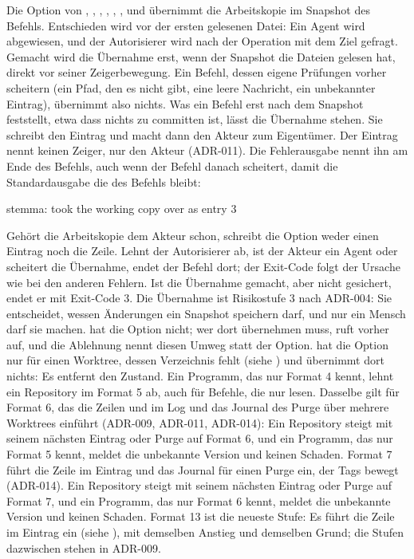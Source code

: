 Die Option  von , , , ,
, ,  und  übernimmt die Arbeitskopie
im Snapshot des Befehls.
Entschieden wird vor der ersten gelesenen Datei: Ein Agent wird abgewiesen, und der Autorisierer
wird nach der Operation  mit dem Ziel  gefragt.
Gemacht wird die Übernahme erst, wenn der Snapshot die Dateien gelesen hat, direkt vor seiner
Zeigerbewegung. Ein Befehl, dessen eigene Prüfungen vorher scheitern (ein Pfad, den es nicht
gibt, eine leere Nachricht, ein unbekannter Eintrag), übernimmt also nichts.
Was ein Befehl erst nach dem Snapshot feststellt, etwa dass nichts zu committen ist,
lässt die Übernahme stehen.
Sie schreibt den Eintrag  und macht dann den Akteur zum Eigentümer.
Der Eintrag nennt keinen Zeiger, nur den Akteur (ADR-011).
Die Fehlerausgabe nennt ihn am Ende des Befehls, auch wenn der Befehl danach scheitert,
damit die Standardausgabe die des Befehls bleibt:

\starttyping
stemma: took the working copy over as entry 3
\stoptyping

Gehört die Arbeitskopie dem Akteur schon, schreibt die Option weder einen Eintrag noch die Zeile.
Lehnt der Autorisierer ab, ist der Akteur ein Agent oder scheitert die Übernahme,
endet der Befehl dort; der Exit-Code folgt der Ursache wie bei den anderen Fehlern.
Ist die Übernahme gemacht, aber nicht gesichert, endet er mit Exit-Code 3.
Die Übernahme ist Risikostufe 3 nach ADR-004: Sie entscheidet, wessen Änderungen ein Snapshot
speichern darf, und nur ein Mensch darf sie machen.  hat
die Option nicht; wer dort übernehmen muss, ruft vorher  auf,
und die Ablehnung nennt diesen Umweg statt der Option.
 hat die Option nur für einen Worktree, dessen Verzeichnis fehlt
(siehe ) und übernimmt dort nichts: Es entfernt den Zustand.
Ein Programm, das nur Format 4 kennt, lehnt ein Repository im Format 5 ab, auch für Befehle,
die nur lesen. Dasselbe gilt für Format 6, das die Zeilen  und 
im Log und das Journal des Purge über mehrere Worktrees einführt (ADR-009, ADR-011, ADR-014):
Ein Repository steigt mit seinem nächsten Eintrag oder Purge auf Format 6, und ein Programm,
das nur Format 5 kennt, meldet die unbekannte Version und keinen Schaden.
Format 7 führt die Zeile  im Eintrag  und das
Journal  für einen Purge ein, der Tags bewegt (ADR-014). Ein Repository
steigt mit seinem nächsten Eintrag oder Purge auf Format 7, und ein Programm, das nur
Format 6 kennt, meldet die unbekannte Version und keinen Schaden.
Format 13 ist die neueste Stufe: Es führt die Zeile  im Eintrag
 ein (siehe ), mit demselben Anstieg und demselben
Grund; die Stufen dazwischen stehen in ADR-009.

